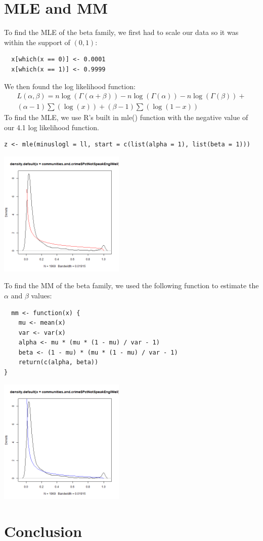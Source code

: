 \documentclass[12pt, letterpaper]{report}
\begin{document}
\section{MLE and MM}
To find the MLE of the beta family, we first had to scale our data so it was within the support of $(0, 1)$: 
\begin{lstlisting}
  x[which(x == 0)] <- 0.0001  
  x[which(x == 1)] <- 0.9999
\end{lstlisting} 
We then found the log likelihood function:
\begin{multline}
L(\alpha, \beta) = n \log{(\Gamma(\alpha+\beta))} - n \log{(\Gamma(\alpha))} - n \log{(\Gamma(\beta))} + \\
(\alpha - 1) \sum(\log(x)) + (\beta-1) \sum(\log{(1-x)})
\end{multline}
To find the MLE, we use R's built in mle() function with the negative value of our 4.1 log likelihood function. 
\begin{lstlisting}
z <- mle(minuslogl = ll, start = c(list(alpha = 1), list(beta = 1)))
\end{lstlisting} 

\begin{center}
\includegraphics[width=0.45\textwidth]{beta/PctNotSpeakEnglWell_mle}
\end{center}

To find the MM of the beta family, we used the following function to estimate the $\alpha$ and $\beta$ values:
\begin{lstlisting}
  mm <- function(x) {
    mu <- mean(x)
    var <- var(x)
    alpha <- mu * (mu * (1 - mu) / var - 1)
    beta <- (1 - mu) * (mu * (1 - mu) / var - 1)
    return(c(alpha, beta))
}
\end{lstlisting} 

\begin{center}
\includegraphics[width=0.45\textwidth]{beta/PctNotSpeakEnglWell_mm}
\end{center}

\section{Conclusion}
\end{document}
